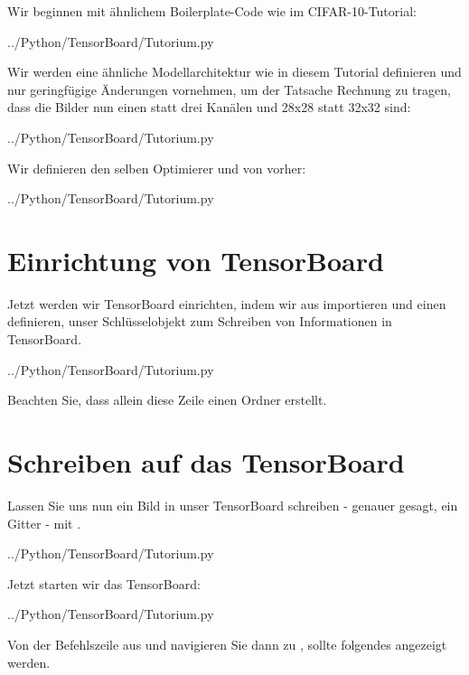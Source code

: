 Wir beginnen mit ähnlichem Boilerplate-Code wie im CIFAR-10-Tutorial:


%

{../Python/TensorBoard/Tutorium.py}

Wir werden eine ähnliche Modellarchitektur wie in diesem Tutorial definieren und nur geringfügige Änderungen vornehmen, um der Tatsache Rechnung zu tragen, dass die Bilder nun einen statt drei Kanälen und 28x28 statt 32x32 sind:


{../Python/TensorBoard/Tutorium.py}

Wir definieren den selben Optimierer  und  von vorher:


{../Python/TensorBoard/Tutorium.py}

\section{Einrichtung von TensorBoard}

Jetzt werden wir TensorBoard einrichten, indem wir  aus  importieren und einen  definieren, unser Schlüsselobjekt zum Schreiben von Informationen in TensorBoard.


{../Python/TensorBoard/Tutorium.py}


Beachten Sie, dass allein diese Zeile einen Ordner  erstellt.

\section{Schreiben auf das TensorBoard}

Lassen Sie uns nun ein Bild in unser TensorBoard schreiben - genauer gesagt, ein Gitter - mit .



{../Python/TensorBoard/Tutorium.py}

Jetzt starten wir das TensorBoard:


{../Python/TensorBoard/Tutorium.py}

Von der Befehlszeile aus und navigieren Sie dann zu , sollte folgendes angezeigt werden.

